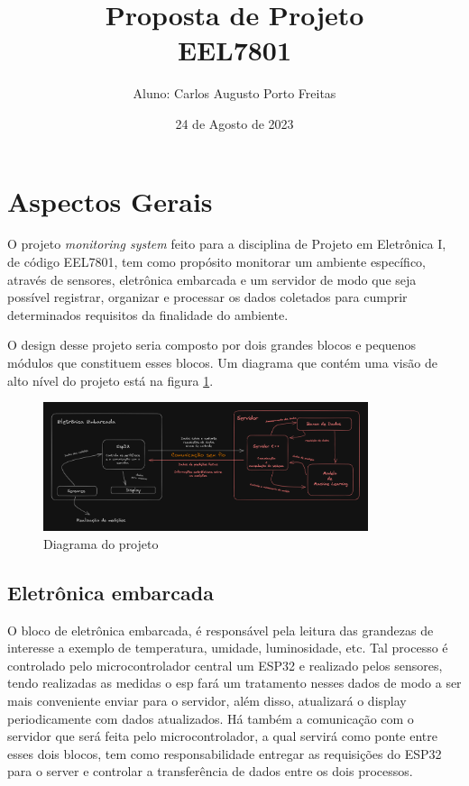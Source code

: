 \documentclass[11pt]{article}
\title{Proposta de Projeto\\ EEL7801}
\author{Aluno: Carlos Augusto Porto Freitas}
\date{24 de Agosto de 2023}
\begin{document}
\maketitle

\section*{Aspectos Gerais}

O projeto \textit{monitoring system} feito para a disciplina de
Projeto em Eletrônica I, de código EEL7801, tem como propósito monitorar
um ambiente específico, através de sensores, eletrônica embarcada e um servidor de modo
que seja possível registrar, organizar e processar os dados coletados para
cumprir determinados requisitos da finalidade do ambiente.

O design desse projeto seria composto por dois grandes blocos e pequenos
módulos que constituem esses blocos. Um diagrama que contém uma visão de alto
nível do projeto está na figura \ref{fig:diagram}.

\begin{figure}[h]
	\centering
	\includegraphics[width=0.85\textwidth,keepaspectratio]{diagramaprojetoI.png}
	\caption{Diagrama do projeto}
	\label{fig:diagram}
\end{figure}

\subsection*{Eletrônica embarcada}

O bloco de eletrônica embarcada, é responsável pela leitura das grandezas de interesse
a exemplo de temperatura, umidade, luminosidade, etc. Tal processo é controlado pelo
microcontrolador central um ESP32 e realizado pelos sensores, tendo realizadas as medidas
o esp fará um tratamento nesses dados de modo a ser mais conveniente enviar para o servidor,
além disso, atualizará o display periodicamente com dados atualizados. Há também a comunicação
com o servidor que será feita pelo microcontrolador, a qual servirá como ponte entre esses dois
blocos, tem como responsabilidade entregar as requisições do ESP32 para o server e controlar a
transferência de dados entre os dois processos.
\end{document}
